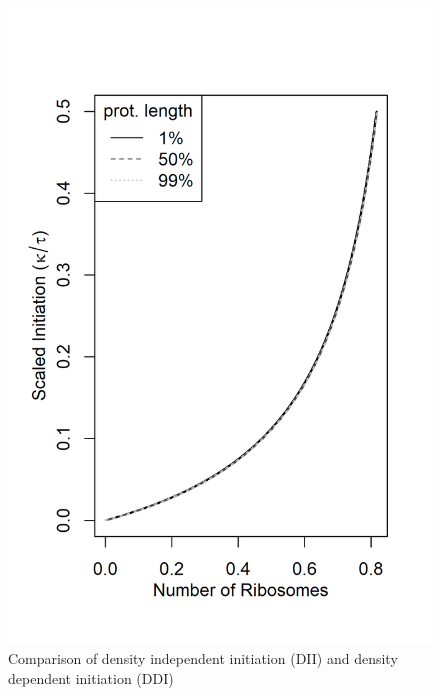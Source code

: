 \documentclass[review]{elsarticle}
\begin{document}
\begin{figure}[ht]
\centering
\includegraphics[width=\textwidth/2]{Images/TE_linear_DDI_scaled_for_imax.png}
\caption{Comparison of density independent initiation (DII) and density dependent initiation (DDI)}
\end{figure}







\end{document}
